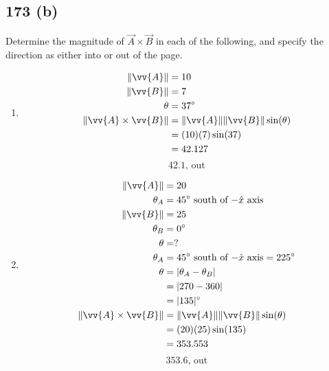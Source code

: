 \documentclass{article}
\begin{document}
\subsection{173 (b)}

Determine the magnitude of $ \vec{A} \times \vec{B} $ in each of the following, and specify the direction as either into or out of the page.

\begin{enumerate}[label=\arabic*)]
    \item
        \begin{align*}
            \|\vv{A}\| & = 10 \\
            \|\vv{B}\| & = 7 \\
            \theta & = 37\degree \\
            \|\vv{A} \times \vv{B}\| & = \|\vv{A}\|\|\vv{B}\|\sin(\theta) \\
                                     & = (10)(7)\sin(37) \\
                                     & = 42.127
        \end{align*}
        \begin{equation*}
            \boxed{42.1 \text{, out}}
        \end{equation*}
    \item
        \begin{align*}
            \|\vv{A}\| & = 20 \\
            \theta_A & = 45\degree \text{ south of $ -\hat{x} $ axis} \\
            \|\vv{B}\| & = 25 \\
            \theta_B & = 0\degree \\
            \theta & = ? \\
            \theta_A & = 45\degree \text{ south of $ -\hat{x} $ axis} = 225\degree \\
            \theta & = |\theta_A - \theta_B| \\
                   & = |270 - 360| \\
                   & = |135|\degree \\
            \|\vv{A} \times \vv{B}\| & = \|\vv{A}\|\|\vv{B}\|\sin(\theta) \\
                                     & = (20)(25)\sin(135) \\
                                     & = 353.553
        \end{align*}
        \begin{equation*}
            \boxed{353.6 \text{, out}}

\end{equation*}
\end{enumerate}
\end{document}
